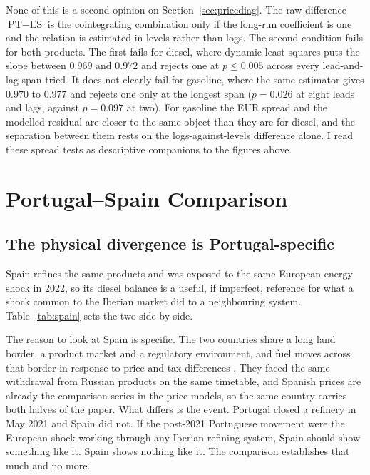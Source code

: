 \documentclass[11pt,a4paper]{article}
\begin{document}
None of this is a second opinion on Section~\ref{sec:pricediag}. The raw difference
$\text{PT}-\text{ES}$ is the cointegrating combination only if the long-run coefficient is one
and the relation is estimated in levels rather than logs. The second condition fails for both
products. The first fails for diesel, where dynamic least squares puts the slope between $0.969$
and $0.972$ and rejects one at $p\le 0.005$ across every lead-and-lag span tried. It does not
clearly fail for gasoline, where the same estimator gives $0.970$ to $0.977$ and rejects one
only at the longest span ($p=0.026$ at eight leads and lags, against $p=0.097$ at two). For
gasoline the EUR spread and the modelled residual are closer to the same object than they are
for diesel, and the separation between them rests on the logs-against-levels difference alone. I
read these spread tests as descriptive companions to the figures above.

\section{Portugal--Spain Comparison}
\label{sec:spain}

\subsection{The physical divergence is Portugal-specific}

Spain refines the same products and was exposed to the same European energy shock in 2022, so
its diesel balance is a useful, if imperfect, reference for what a shock common to the Iberian
market did to a neighbouring system. Table~\ref{tab:spain} sets the two side by side.

The reason to look at Spain is specific. The two countries share a long land border, a product
market and a regulatory environment, and fuel moves across that border in response to price and
tax differences \citep{leal2009prices, banfi2005fuel}. They faced the same withdrawal from
Russian products on the same timetable, and Spanish prices are already the comparison series in
the price models, so the same country carries both halves of the paper. What differs is the
event. Portugal closed a refinery in May 2021 and Spain did not. If the post-2021 Portuguese
movement were the European shock working through any Iberian refining system, Spain should show
something like it. Spain shows nothing like it. The comparison establishes that much and no
more.
\end{document}
